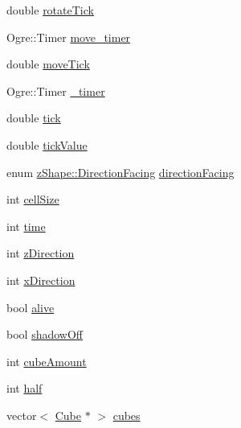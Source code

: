 \begin{DoxyCompactItemize}
double \hyperlink{classz_shape_ababb157263bf9c66de983ac1e5ddec6d}{rotate\-Tick}
\item 
Ogre\-::\-Timer \hyperlink{classz_shape_a56e2cca0a696cf28fa4244ce20267fb4}{move\-\_\-timer}
\item 
double \hyperlink{classz_shape_a06a862d298b4fe36236834a39af1d7b4}{move\-Tick}
\item 
Ogre\-::\-Timer \hyperlink{classz_shape_a2e34a7774c32ab986afcb352bee6de9b}{\-\_\-timer}
\item 
double \hyperlink{classz_shape_add03bb3345a58059a1f76a4cfaaedb54}{tick}
\item 
double \hyperlink{classz_shape_af8baf4bfde98df012d1389768d9571b0}{tick\-Value}
\item 
enum \hyperlink{classz_shape_ab60d2ccafff31987c3134b99ffdfc168}{z\-Shape\-::\-Direction\-Facing} \hyperlink{classz_shape_a22d2f5fca91a1b455a17d5e8fbe4a280}{direction\-Facing}
\item 
int \hyperlink{classz_shape_a0437d50ec76bf6fbe2522ead9b3184e0}{cell\-Size}
\item 
int \hyperlink{classz_shape_a772c76f69f30fefa4b8d08a9d1546dba}{time}
\item 
int \hyperlink{classz_shape_a4ec37982be7b7b02dbb92135629218f2}{z\-Direction}
\item 
int \hyperlink{classz_shape_ab05ebfad3001a2ff2747f7e788efaf06}{x\-Direction}
\item 
bool \hyperlink{classz_shape_a1796431468e8e0b2073e28d94bc4c5bd}{alive}
\item 
bool \hyperlink{classz_shape_a893430248d4812e90d8deca062d39820}{shadow\-Off}
\item 
int \hyperlink{classz_shape_a720c53d979680d3ccd67f453cf45be7e}{cube\-Amount}
\item 
int \hyperlink{classz_shape_a6fb508e0180de23b90db911b1bb97003}{half}
\item 
vector$<$ \hyperlink{class_cube}{Cube} $\ast$ $>$ \hyperlink{classz_shape_aa0d1a3c2b46801c1064c43d33094f29e}{cubes}
\end{DoxyCompactItemize}


